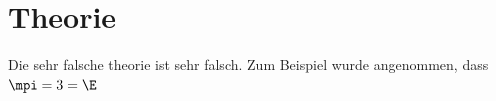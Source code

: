 \section{Theorie}
\label{sec:Theorie}
Die sehr falsche theorie ist sehr falsch.
Zum Beispiel wurde angenommen, dass $\mpi = 3 = \E $
\cite{sample}

